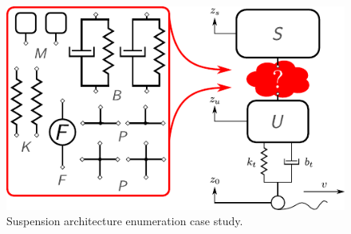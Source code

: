\begin{figure}
\centering
\includegraphics[width=0.6\columnwidth]{../ch2/figures/suspension1}
\caption{Suspension architecture enumeration case study.\label{fig:ch2:suspension1}}
\end{figure}